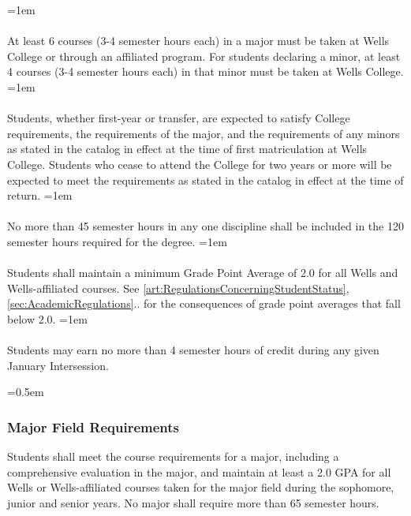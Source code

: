 \documentclass{manual}
\newcommand{\modified}[1]{}
\newcommand{\oldbreak}[1]{}
\let\oldsubsubsection\subsubsection
\renewcommand\subsubsection{\leftskip=0.5em\oldsubsubsection}
\let\oldparagraph\paragraph
\renewcommand\paragraph{\leftskip=1em\oldparagraph}
\begin{document}
\paragraph{} At least 6 courses (3-4 semester hours each) in a major must be taken at Wells College or through an affiliated program. For students declaring a minor, at least 4 courses (3-4 semester hours each) in that minor must be taken at Wells College.
\paragraph{} Students, whether first-year or transfer, are expected to satisfy College requirements, the requirements of the major, and the requirements \modified{4/8/97} of any minors as stated in the catalog in effect at the time of first matriculation at Wells College. Students who cease to attend the College for two years or more will be expected to meet the requirements as stated in the catalog in effect at the time of return.
\paragraph{} No more than 45 semester hours in any one discipline shall be included \modified{5/13/93}  in the 120 semester hours required for the degree.
\paragraph{} Students shall maintain a minimum Grade Point Average of 2.0 for all Wells and Wells-affiliated courses. See \cref{art:RegulationsConcerningStudentStatus}, \cref{sec:AcademicRegulations}.. for the consequences of grade point averages that fall below 2.0.
\paragraph{} Students may earn no more than 4 semester hours of credit during any given January  Intersession.\modified{2/8/05}


\oldbreak{IV-I}

\subsubsection{Major Field Requirements}

Students \modified{5/13/93} shall meet the course requirements for a major, including a comprehensive evaluation in the major, and maintain at least a 2.0 GPA for all Wells or Wells-affiliated courses taken for the major field during the sophomore, junior and senior years. No major shall require more than 65 semester hours.
\end{document}
